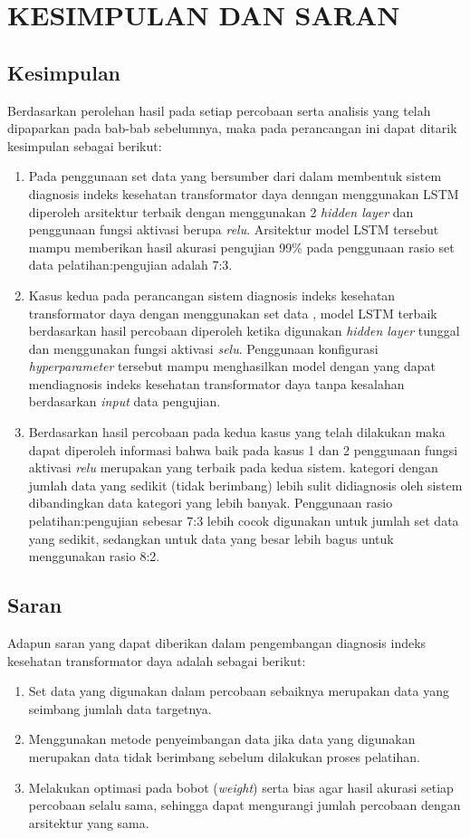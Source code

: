 \chapter{KESIMPULAN DAN SARAN}

\section{Kesimpulan}
Berdasarkan perolehan hasil pada setiap percobaan serta analisis yang telah dipaparkan pada bab-bab sebelumnya, maka pada perancangan ini dapat ditarik kesimpulan sebagai berikut:
\begin{enumerate}
	\item Pada penggunaan set data yang bersumber dari \cite{shah2016predict} dalam membentuk sistem diagnosis indeks kesehatan transformator daya denngan menggunakan LSTM diperoleh arsitektur terbaik dengan menggunakan 2 \textit{hidden layer} dan penggunaan fungsi aktivasi berupa \textit{relu}. Arsitektur model LSTM tersebut mampu memberikan hasil akurasi pengujian 99\% pada penggunaan rasio set data pelatihan:pengujian adalah 7:3.
	\item Kasus kedua pada perancangan sistem diagnosis indeks kesehatan transformator daya dengan menggunakan set data \cite{abu2012calculation}, model LSTM terbaik berdasarkan hasil percobaan diperoleh ketika digunakan \textit{hidden layer} tunggal dan menggunakan fungsi aktivasi \textit{selu}. Penggunaan konfigurasi \textit{hyperparameter} tersebut mampu menghasilkan model dengan yang dapat mendiagnosis indeks kesehatan transformator daya tanpa kesalahan berdasarkan \textit{input} data pengujian.
	\item Berdasarkan hasil percobaan pada kedua kasus yang telah dilakukan maka dapat diperoleh informasi bahwa baik pada kasus 1 dan 2 penggunaan fungsi aktivasi \textit{relu} merupakan yang terbaik pada kedua sistem. kategori dengan jumlah data yang sedikit (tidak berimbang) lebih sulit didiagnosis oleh sistem dibandingkan data kategori yang lebih banyak. Penggunaan rasio pelatihan:pengujian sebesar 7:3 lebih cocok digunakan untuk jumlah set data yang sedikit, sedangkan untuk data yang besar lebih bagus untuk menggunakan rasio 8:2.
\end{enumerate}

\section{Saran}
Adapun saran yang dapat diberikan dalam pengembangan diagnosis indeks kesehatan transformator daya adalah sebagai berikut:
\begin{enumerate}
	\item Set data yang digunakan dalam percobaan sebaiknya merupakan data yang seimbang jumlah data targetnya.
	\item Menggunakan metode penyeimbangan data jika data yang digunakan merupakan data tidak berimbang sebelum dilakukan proses pelatihan.
	\item Melakukan optimasi pada bobot (\textit{weight}) serta bias agar hasil akurasi setiap percobaan selalu sama, sehingga dapat mengurangi jumlah percobaan dengan arsitektur yang sama.
\end{enumerate}